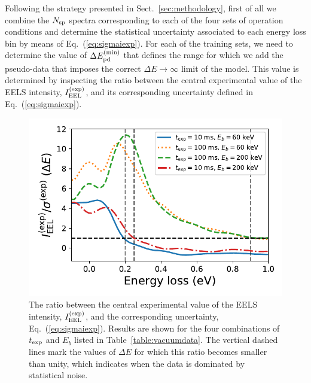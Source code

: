 Following the strategy presented in Sect.~\ref{sec:methodology}, first of all we combine the $N_{\rm sp}$ spectra
corresponding to each of the four sets of operation conditions and determine the statistical uncertainty
associated to each energy loss bin by means of Eq.~(\ref{eq:sigmaiexp}).
%
For each of the training sets, we need to determine the value of $\Delta E_{\rm pd}^{\rm (min)}$
that defines the range for which we add the  pseudo-data
that imposes the correct $\Delta E \to \infty$ limit of the model.
%
This value is determined
by inspecting the ratio between the central experimental value of the 
EELS intensity, $I_{{\rm EEL}}^{(\rm exp)}$, and its corresponding uncertainty defined in Eq.~(\ref{eq:sigmaiexp}).
      
\begin{figure}[t]
    \centering
    \includegraphics[width=125mm]{plots/intensity_to_error_ratio.pdf}
    \caption{\small The ratio between the central experimental value of the 
      EELS intensity, $I_{{\rm EEL}}^{(\rm exp)}$, and the corresponding
      uncertainty, Eq.~(\ref{eq:sigmaiexp}).
      Results are shown for the four combinations of $t_{\rm exp}$
      and $E_{b}$ listed in Table~\ref{table:vacuumdata}.
      The vertical dashed lines mark the values of $\Delta E$ for which
      this ratio becomes smaller than unity, which indicates when the
      data is dominated by statistical noise.
      }
    \label{fig:intensityratio}
\end{figure}


